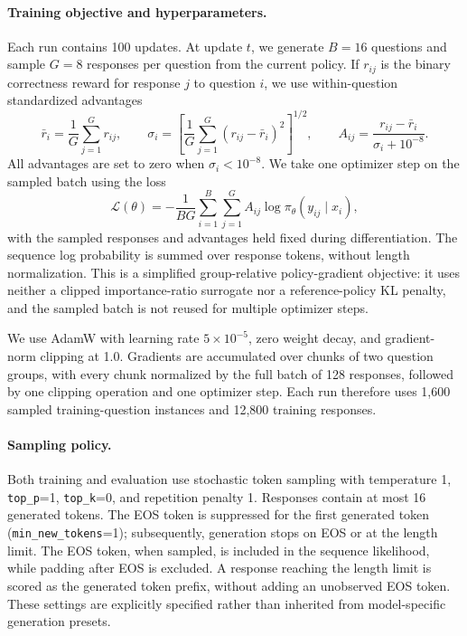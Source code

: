 \paragraph{Training objective and hyperparameters.}
Each run contains 100 updates. At update $t$, we generate $B=16$ questions
and sample $G=8$ responses per question from the current policy. If $r_{ij}$
is the binary correctness reward for response $j$ to question $i$, we use
within-question standardized advantages
\[
 \bar r_i=\frac{1}{G}\sum_{j=1}^{G}r_{ij},\qquad
 \sigma_i=\left[\frac{1}{G}\sum_{j=1}^{G}(r_{ij}-\bar r_i)^2\right]^{1/2},
 \qquad
 A_{ij}=\frac{r_{ij}-\bar r_i}{\sigma_i+10^{-8}}.
\]
All advantages are set to zero when $\sigma_i<10^{-8}$.
We take one optimizer step on the sampled batch using the loss
\[
 \mathcal{L}(\theta)
 =-\frac{1}{BG}\sum_{i=1}^{B}\sum_{j=1}^{G}
       A_{ij}\log\pi_\theta(y_{ij}\mid x_i),
\]
with the sampled responses and advantages held fixed during differentiation.
The sequence log probability is summed over response tokens, without
length normalization. This is a simplified group-relative policy-gradient
objective: it uses neither a clipped importance-ratio surrogate nor a
reference-policy KL penalty, and the sampled batch is not reused for
multiple optimizer steps.

We use AdamW with learning rate $5\times10^{-5}$, zero weight decay,
and gradient-norm clipping at 1.0. Gradients are accumulated over chunks
of two question groups, with every chunk normalized by the full batch of
128 responses, followed by one clipping operation and one optimizer step.
Each run therefore uses 1,600 sampled training-question instances and
12,800 training responses.

\paragraph{Sampling policy.}
Both training and evaluation use stochastic token sampling with temperature
1, \texttt{top\_p}=1, \texttt{top\_k}=0, and repetition penalty 1.
Responses contain at most 16 generated tokens. The EOS token is suppressed
for the first generated token (\texttt{min\_new\_tokens}=1); subsequently,
generation stops on EOS or at the length limit. The EOS token, when sampled,
is included in the sequence likelihood, while padding after EOS is excluded.
A response reaching the length limit is scored as the generated token
prefix, without adding an unobserved EOS token. These settings are explicitly
specified rather than inherited from model-specific generation presets.

